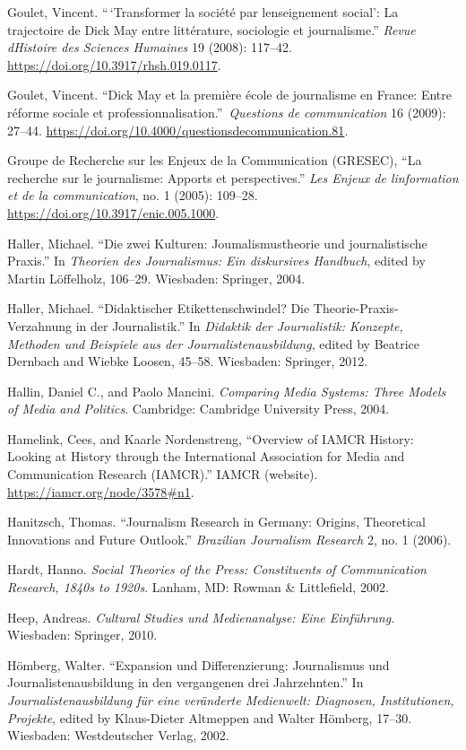 \documentclass{tufte-handout}
\begin{document}
\begin{hangparas}{.25in}{1}
Goulet, Vincent. ``\,`Transformer la société par
l\textquotesingle enseignement social': La trajectoire de Dick May entre
littérature, sociologie et journalisme.'' \emph{Revue
d\textquotesingle Histoire des Sciences Humaines} 19 (2008): 117--42.
\url{https://doi.org/10.3917/rhsh.019.0117}.

Goulet, Vincent. ``Dick May et la première école de journalisme en
France: Entre réforme sociale et professionnalisation.''~\emph{Questions
de communication} 16 (2009): 27--44.
\url{https://doi.org/10.4000/questionsdecommunication.81}.

Groupe de Recherche sur les Enjeux de la Communication (GRESEC), ``La
recherche sur le journalisme: Apports et perspectives.'' \emph{Les
Enjeux de l\textquotesingle information et de la communication}, no. 1
(2005): 109--28. \url{https://doi.org/10.3917/enic.005.1000}.

Haller, Michael. ``Die zwei Kulturen: Joumalismustheorie und
journalistische Praxis.'' In \emph{Theorien des Journalismus: Ein
diskursives Handbuch}, edited by Martin Löffelholz, 106--29. Wiesbaden:
Springer, 2004.

Haller, Michael. ``Didaktischer Etikettenschwindel? Die
Theorie-Praxis-Verzahnung in der Journalistik.'' In \emph{Didaktik der
Journalistik: Konzepte, Methoden und Beispiele aus der
Journalistenausbildung}, edited by Beatrice Dernbach and Wiebke Loosen,
45--58. Wiesbaden: Springer, 2012.

Hallin, Daniel C., and Paolo Mancini. \emph{Comparing Media Systems:
Three Models of Media and Politics}. Cambridge: Cambridge University
Press, 2004.

Hamelink, Cees, and Kaarle Nordenstreng, ``Overview of IAMCR History:
Looking at History through the International Association for Media and
Communication Research (IAMCR).'' IAMCR (website).
\url{https://iamcr.org/node/3578\#n1}.

Hanitzsch, Thomas. ``Journalism Research in Germany: Origins,
Theoretical Innovations and Future Outlook.'' \emph{Brazilian Journalism
Research} 2, no. 1 (2006).

Hardt, Hanno. \emph{Social Theories of the Press: Constituents of
Communication Research, 1840s to 1920s}. Lanham, MD: Rowman \&
Littlefield, 2002.

Heep, Andreas. \emph{Cultural Studies und Medienanalyse: Eine
Einführung}. Wiesbaden: Springer, 2010.

Hömberg, Walter. ``Expansion und Differenzierung: Journalismus und
Journalistenausbildung in den vergangenen drei Jahrzehnten.'' In
\emph{Journalistenausbildung für eine veränderte Medienwelt: Diagnosen,
Institutionen, Projekte}, edited by Klaus-Dieter Altmeppen and Walter
Hömberg, 17--30. Wiesbaden: Westdeutscher Verlag, 2002.


\end{hangparas}
\end{document}
